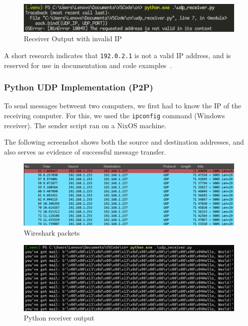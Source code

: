 \begin{figure}[htbp]
	\centering
	\includegraphics[width=1\linewidth]{img/second_exp/5.png}
	\caption{Receiver Output with invalid IP}\label{fig:2_5}
\end{figure}

A short research indicates that \texttt{192.0.2.1} is not a valid IP address,
and is reserved for use in documentation and code examples~\cite{rfc5735}.

\subsubsection{Python UDP Implementation (P2P)}

To send messages betweent two computers, we first had to know the IP of the
receiving computer. For this, we used the \texttt{ipconfig} command (Windows
receiver). The sender script ran on a NixOS machine.

The following screenshot shows both the source and destination addresses, and
also serves as evidence of successful message transfer.

\begin{figure}[htbp]
	\centering
	\includegraphics[width=1\linewidth]{img/second_exp/6.png}
	\caption{Wireshark packets}\label{fig:2_6}
\end{figure}

\begin{figure}[htbp]
	\centering
	\includegraphics[width=1\linewidth]{img/second_exp/7.png}
	\caption{Python receiver output}\label{fig:2_7}
\end{figure}

